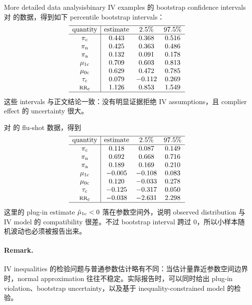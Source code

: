 \begin{exercisesolution}{More detailed data analysis}{binary IV examples 的 bootstrap confidence intervals}
对 \citet{improve2014endovascular} 的数据，得到如下 percentile bootstrap intervals：
\[
\begin{array}{c|ccc}
\hline
\text{quantity} & \text{estimate} & 2.5\% & 97.5\%\\
\hline
\pi_{\textup{c}} & 0.443 & 0.368 & 0.516\\
\pi_{\textup{n}} & 0.425 & 0.363 & 0.486\\
\pi_{\textup{a}} & 0.132 & 0.091 & 0.178\\
\mu_{1\textup{c}} & 0.709 & 0.603 & 0.813\\
\mu_{0\textup{c}} & 0.629 & 0.472 & 0.785\\
\tau_{\textup{c}} & 0.079 & -0.112 & 0.269\\
\textsc{rr}_{\textup{c}} & 1.126 & 0.853 & 1.549\\
\hline
\end{array}
\]
这些 intervals 与正文结论一致：没有明显证据拒绝 IV assumptions，且 complier effect 的 uncertainty 很大。

对 \citet{hirano2000assessing} 的 flu-shot 数据，得到
\[
\begin{array}{c|ccc}
\hline
\text{quantity} & \text{estimate} & 2.5\% & 97.5\%\\
\hline
\pi_{\textup{c}} & 0.118 & 0.087 & 0.149\\
\pi_{\textup{n}} & 0.692 & 0.668 & 0.716\\
\pi_{\textup{a}} & 0.189 & 0.169 & 0.210\\
\mu_{1\textup{c}} & -0.005 & -0.108 & 0.083\\
\mu_{0\textup{c}} & 0.120 & -0.033 & 0.278\\
\tau_{\textup{c}} & -0.125 & -0.317 & 0.050\\
\textsc{rr}_{\textup{c}} & -0.038 & -2.631 & 2.298\\
\hline
\end{array}
\]
这里的 plug-in estimate $\hat\mu_{1\textup{c}}<0$ 落在参数空间外，说明 observed distribution 与 IV model 的 compatibility 很差。不过 bootstrap interval 跨过 $0$，所以小样本随机波动也必须被报告出来。

\paragraph{Remark.}
IV inequalities 的检验问题与普通参数估计略有不同：当估计量靠近参数空间边界时，normal approximation 往往不稳定。实际报告时，可以同时给出 plug-in violation、bootstrap uncertainty，以及基于 inequality-constrained model 的检验。
\end{exercisesolution}

